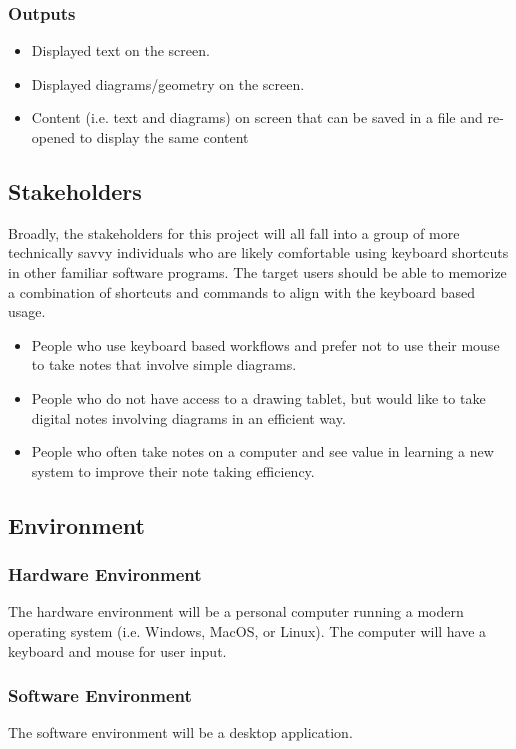 \documentclass{article}
\begin{document}
\subsubsection{Outputs}
\begin{itemize}
	\item Displayed text on the screen.
  \item Displayed diagrams/geometry on the screen.
  \item Content (i.e. text and diagrams) on screen that can be saved in a file
    and re-opened to display the same content
\end{itemize}

\subsection{Stakeholders}
Broadly, the stakeholders for this project will all fall into a group of more
technically savvy individuals who are likely comfortable using keyboard
shortcuts in other familiar software programs. The target users should be able
to memorize a combination of shortcuts and commands to align with the keyboard
based usage.

\begin{itemize}
  \item People who use keyboard based workflows and prefer not to use their
    mouse to take notes that involve simple diagrams.
  \item People who do not have access to a drawing tablet, but would like to
    take digital notes involving diagrams in an efficient way.
  \item People who often take notes on a computer and see value in learning a
    new system to improve their note taking efficiency.
\end{itemize}

\subsection{Environment}

\subsubsection{Hardware Environment}
The hardware environment will be a personal computer running a modern operating
system (i.e. Windows, MacOS, or Linux). The computer will have a keyboard and
mouse for user input.

\subsubsection{Software Environment}
The software environment will be a desktop application.
\end{document}
